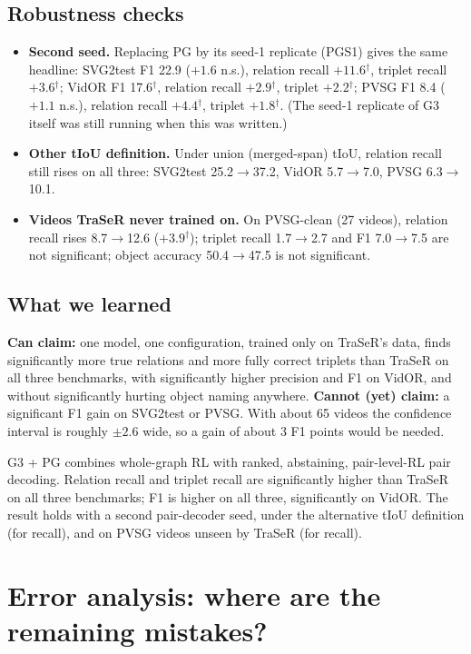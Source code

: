 \documentclass[11pt,openany]{book}
\newcommand{\sig}{\ensuremath{^\dagger}}
\newcommand{\lsec}{\section*{What we learned}}
\begin{document}
\section*{Robustness checks}
\begin{itemize}
  \item \textbf{Second seed.} Replacing PG by its seed-1 replicate (PGS1) gives the same headline: SVG2test F1 22.9 ($+1.6$
  n.s.), relation recall $+11.6$\sig, triplet recall $+3.6$\sig; VidOR F1 17.6\sig, relation recall $+2.9$\sig, triplet $+2.2$\sig;
  PVSG F1 8.4 ($+1.1$ n.s.), relation recall $+4.4$\sig, triplet $+1.8$\sig. (The seed-1 replicate of G3 itself was still running
  when this was written.)
  \item \textbf{Other tIoU definition.} Under union (merged-span) tIoU, relation recall still rises on all three: SVG2test
  25.2$\to$37.2, VidOR 5.7$\to$7.0, PVSG 6.3$\to$10.1.
  \item \textbf{Videos TraSeR never trained on.} On PVSG-clean (27 videos), relation recall rises 8.7$\to$12.6 ($+3.9$\sig); triplet
  recall 1.7$\to$2.7 and F1 7.0$\to$7.5 are not significant; object accuracy 50.4$\to$47.5 is not significant.
\end{itemize}

\lsec
\begin{keyidea}
\textbf{Can claim:} one model, one configuration, trained only on TraSeR's data, finds significantly more true relations and more
fully correct triplets than TraSeR on all three benchmarks, with significantly higher precision and F1 on VidOR, and without
significantly hurting object naming anywhere. \textbf{Cannot (yet) claim:} a significant F1 gain on SVG2test or PVSG. With about 65
videos the confidence interval is roughly $\pm 2.6$ wide, so a gain of about 3 F1 points would be needed.
\end{keyidea}

\begin{summarybox}
G3 + PG combines whole-graph RL with ranked, abstaining, pair-level-RL pair decoding. Relation recall and triplet recall are
significantly higher than TraSeR on all three benchmarks; F1 is higher on all three, significantly on VidOR. The result holds with a
second pair-decoder seed, under the alternative tIoU definition (for recall), and on PVSG videos unseen by TraSeR (for recall).
\end{summarybox}

\chapter{Error analysis: where are the remaining mistakes?}\label{ch:errors}
\end{document}
